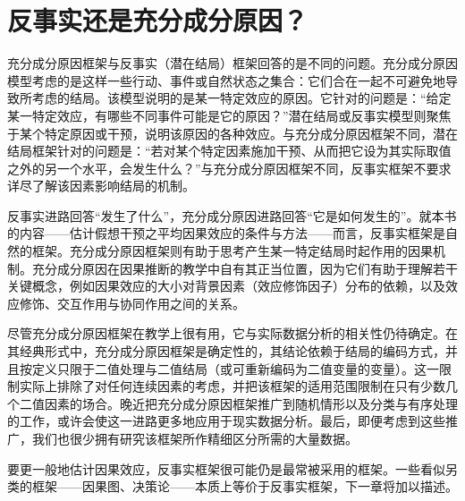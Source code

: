 \section{反事实还是充分成分原因？}

充分成分原因框架与反事实（潜在结局）框架回答的是不同的问题。充分成分原因模型考虑的是这样一些行动、事件或自然状态之集合：它们合在一起不可避免地导致所考虑的结局。该模型说明的是某一特定效应的原因。它针对的问题是：“给定某一特定效应，有哪些不同事件可能是它的原因？”潜在结局或反事实模型则聚焦于某个特定原因或干预，说明该原因的各种效应。与充分成分原因框架不同，潜在结局框架针对的问题是：“若对某个特定因素施加干预、从而把它设为其实际取值之外的另一个水平，会发生什么？”与充分成分原因框架不同，反事实框架不要求详尽了解该因素影响结局的机制。


反事实进路回答“发生了什么”，充分成分原因进路回答“它是如何发生的”。就本书的内容——估计假想干预之平均因果效应的条件与方法——而言，反事实框架是自然的框架。充分成分原因框架则有助于思考产生某一特定结局时起作用的因果机制。充分成分原因在因果推断的教学中自有其正当位置，因为它们有助于理解若干关键概念，例如因果效应的大小对背景因素（效应修饰因子）分布的依赖，以及效应修饰、交互作用与协同作用之间的关系。

尽管充分成分原因框架在教学上很有用，它与实际数据分析的相关性仍待确定。在其经典形式中，充分成分原因框架是确定性的，其结论依赖于结局的编码方式，并且按定义只限于二值处理与二值结局（或可重新编码为二值变量的变量）。这一限制实际上排除了对任何连续因素的考虑，并把该框架的适用范围限制在只有少数几个二值因素的场合。晚近把充分成分原因框架推广到随机情形以及分类与有序处理的工作，或许会使这一进路更多地应用于现实数据分析。最后，即便考虑到这些推广，我们也很少拥有研究该框架所作精细区分所需的大量数据。

要更一般地估计因果效应，反事实框架很可能仍是最常被采用的框架。一些看似另类的框架——因果图、决策论——本质上等价于反事实框架，下一章将加以描述。

